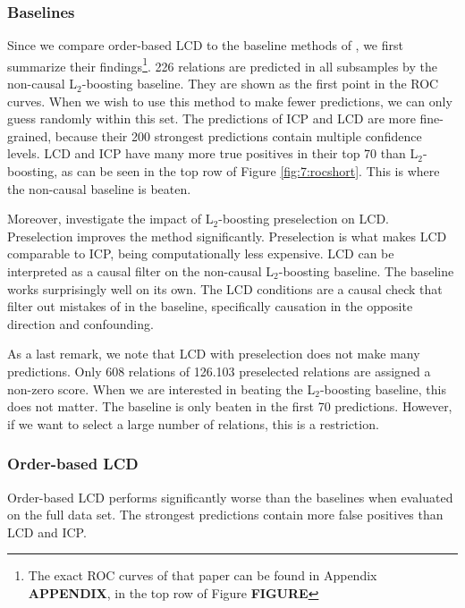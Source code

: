 \subsubsection{Baselines}

Since we compare order-based LCD to the baseline methods of \citet{versteeg2019boosting}, we first summarize their findings\footnote{The exact ROC curves of that paper can be found in Appendix \textbf{APPENDIX}, in the top row of Figure \textbf{FIGURE}}. 226 relations are predicted in all subsamples by the non-causal L$_2$-boosting baseline. They are shown as the first point in the ROC curves. When we wish to use this method to make fewer predictions, we can only guess randomly within this set. The predictions of ICP and LCD are more fine-grained, because their 200 strongest predictions contain multiple confidence levels. LCD and ICP have many more true positives in their top 70 than L$_2$-boosting, as can be seen in the top row of Figure \ref{fig:7:rocshort}. This is where the non-causal baseline is beaten.

Moreover, \citet{versteeg2019boosting} investigate the impact of L$_2$-boosting preselection on LCD. Preselection improves the method significantly. Preselection is what makes LCD comparable to ICP, being computationally less expensive. LCD can be interpreted as a causal filter on the non-causal L$_2$-boosting baseline. The baseline works surprisingly well on its own. The LCD conditions are a causal check that filter out mistakes of in the baseline, specifically causation in the opposite direction and confounding.

As a last remark, we note that LCD with preselection does not make many predictions. Only 608 relations of 126.103 preselected relations are assigned a non-zero score. When we are interested in beating the L$_2$-boosting baseline, this does not matter. The baseline is only beaten in the first 70 predictions. However, if we want to select a large number of relations, this is a restriction.


\subsubsection{Order-based LCD}

Order-based LCD performs significantly worse than the baselines when evaluated on the full data set. The strongest predictions contain more false positives than LCD and ICP. 

